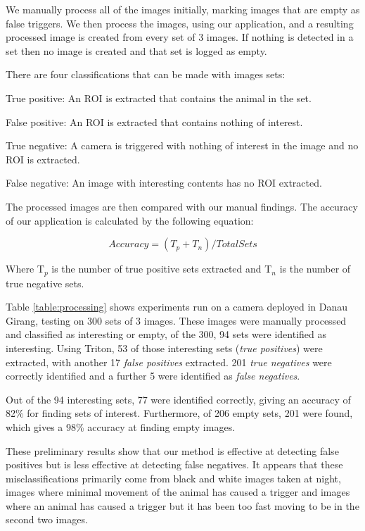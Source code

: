 		We manually process all of the images initially, marking images that are empty as false triggers. We then process the images, using our application, and a resulting processed image is created from every set of 3 images. If nothing is detected in a set then no image is created and that set is logged as empty. 
		
		There are four classifications that can be made with images sets:
		\begin{description}
			\item True positive: An ROI is extracted that contains the animal in the set.
			\item False positive: An ROI is extracted that contains nothing of interest.
			\item True negative: A camera is triggered with nothing of interest in the image and no ROI is extracted.
			\item False negative: An image with interesting contents has no ROI extracted.
		\end{description}
		
		The processed images are then compared with our manual findings. The accuracy of our application is calculated by the following equation:
		
		\begin{equation}Accuracy = (T_{p} + T_{n})/Total Sets\end{equation}
		
		Where T$_{p}$  is the number of true positive sets extracted and T$_{n}$  is the number of true negative sets.
		
		Table \ref{table:processing} shows experiments run on a camera deployed in Danau Girang, testing on 300 sets of 3 images. These images were manually processed and classified as interesting or empty, of the 300, 94 sets were identified as interesting. Using Triton, 53 of those interesting sets ({\it true positives}) were extracted, with another 17 {\it false positives} extracted. 201 {\it true negatives} were correctly identified and a further 5 were identified as {\it false negatives}. 
		
		Out of the 94 interesting sets, 77 were identified correctly, giving an accuracy of 82\% for finding sets of interest. Furthermore, of 206 empty sets, 201 were found, which gives a 98\% accuracy at finding empty images.
	
		These preliminary results show that our method is effective at detecting false positives but is less effective at detecting false negatives. It appears that these misclassifications primarily come from black and white images taken at night, images where minimal movement of the animal has caused a trigger and images where an animal has caused a trigger but it has been too fast moving to be in the second two images.
		
